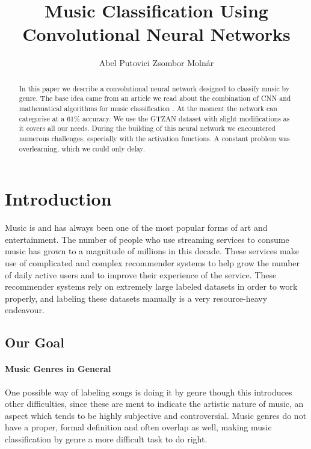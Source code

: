\documentclass{article}
\title{Music Classification Using Convolutional Neural Networks}
\author{%
Abel Putovici\And
Zsombor Molnár
}
\begin{document}
    \maketitle

\begin{abstract}
	In this paper we describe a convolutional neural network designed to classify music by genre.
	The base idea came from an article we read about the combination of CNN and mathematical algorithms for music classification \cite{sample}.
	At the moment the network can categorise at a 61\% accuracy.
	We use the GTZAN dataset with slight modifications as it covers all our needs.
	During the building of this neural network we encountered numerous challenges, especially with the activation functions.
	A constant problem was overlearning, which we could only delay. 
\end{abstract}


    \section{Introduction}

    Music is and has always been one of the most popular forms of art and
    entertainment. The number of people who use streaming services to consume music
    has grown to a magnitude of millions in this decade. These services make use of
    complicated and complex recommender systems to help grow the number of
    daily active users and to improve their experience of the service. These recommender
    systems rely on extremely large labeled datasets in order to work properly, and
    labeling these datasets manually is a very resource-heavy endeavour.

    \subsection{Our Goal}

    \paragraph{Music Genres in General}

    One possible way of labeling songs is doing it by genre though this introduces
    other difficulties, since these are ment to indicate the artistic nature of music, an
    aspect which tends to be highly subjective and controversial. Music genres do not have a
    proper, formal definition and often overlap as well, making music classification by
    genre a more difficult task to do right.
\end{document}
